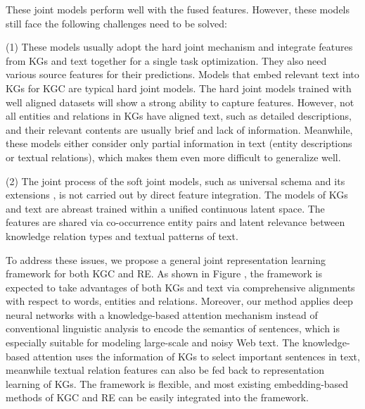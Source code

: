 \documentclass[letterpaper]{article} %
\begin{document}
These joint models perform well with the fused features. However, these models still face the following challenges need to be solved:

(1) These models usually adopt the hard joint mechanism and integrate features from KGs and text together for a single task optimization. They also need various source features for their predictions. Models \cite{zhong2015aligning,xie2016representation,wang2016text} that embed relevant text into KGs for KGC are typical hard joint models. The hard joint models trained with well aligned datasets will show a strong ability to capture features. However, not all entities and relations in KGs have aligned text, such as detailed descriptions, and their relevant contents are usually brief and lack of information. Meanwhile, these models either consider only partial information in text (entity descriptions or textual relations), which makes them even more difficult to generalize well.

(2) The joint process of the soft joint models, such as universal schema and its extensions \cite{riedel2013relation,vergaEtAl}, is not carried out by direct feature integration. The models of KGs and text are abreast trained within a unified continuous latent space. The features are shared via co-occurrence entity pairs and latent relevance between knowledge relation types and textual patterns of text.







  










To address these issues, we propose a general joint representation learning framework for both KGC and RE. As shown in Figure , the framework is expected to take advantages of both KGs and text via comprehensive alignments with respect to words, entities and relations. Moreover, our method applies deep neural networks with a knowledge-based attention mechanism instead of conventional linguistic analysis to encode the semantics of sentences, which is especially suitable for modeling large-scale and noisy Web text. The knowledge-based attention uses the information of KGs to select important sentences in text, meanwhile textual relation features can also be fed back to representation learning of KGs. The framework is flexible, and most existing embedding-based methods of KGC and RE can be easily integrated into the framework.
\end{document}
